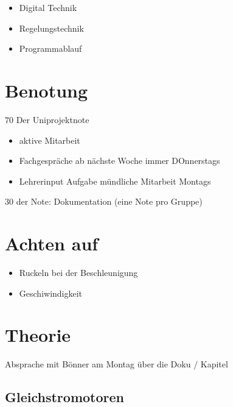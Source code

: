 \documentclass{article}
\begin{document}
\begin{itemize}

	\item Digital Technik

	\item Regelungstechnik

	\item Programmablauf

\end{itemize}

\section{Benotung}

$70$ Der Uniprojektnote

\begin{itemize}

	\item aktive Mitarbeit

	\item Fachgespr\"{a}che ab n\"{a}chste Woche immer DOnnerstags

	\item Lehrerinput Aufgabe m\"{u}ndliche Mitarbeit Montags

\end{itemize}


$30$ der Note:
Dokumentation (eine Note pro Gruppe)
\section{Achten auf}

\begin{itemize}

	\item Ruckeln bei der Beschleunigung

	\item Geschiwindigkeit

\end{itemize}

\section{Theorie}

Absprache mit B\"{o}nner am Montag \"{u}ber die Doku / Kapitel

\subsection{Gleichstromotoren}
\end{document}
